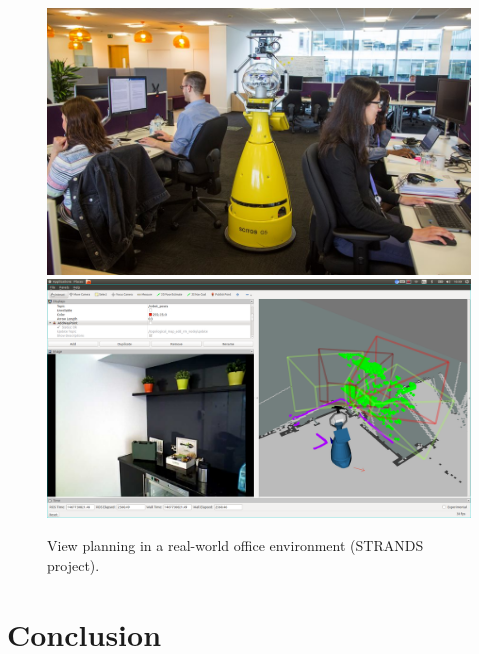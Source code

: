 \documentclass[runningheads,a4paper]{llncs}
\begin{document}
\begin{figure}[tb]
  \begin{center}
    \includegraphics[width=.43\columnwidth]{images/betty.jpg}
    \includegraphics[width=.55\columnwidth,clip,trim=10ex 20ex 10ex 20ex]{images/viewplanning_at_tsc.png}
  \end{center}   
  \caption{View planning in a real-world office environment (STRANDS project).}
  \label{fig:mk}
  \vspace{-3ex}
\end{figure}

\section{Conclusion}



\end{document}
